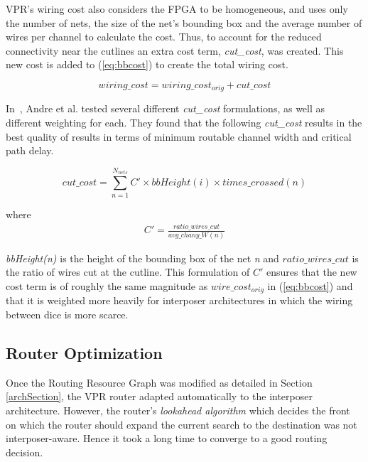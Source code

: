 \documentclass{sig-alternate-2013}
\begin{document}
VPR's wiring cost also considers the FPGA to be homogeneous, and uses only the number of nets, the size of the net's bounding box and the average number of wires per channel to calculate the cost. Thus, to account for the reduced connectivity near the cutlines an extra cost term, \textit{cut\_cost}, was created. This new cost is added to (\ref{eq:bbcost}) to create the total wiring cost.

\begin{equation} \label{eq:total_wiring}
wiring\_cost = wiring\_cost_{orig} + cut\_cost
\end{equation}

In~\cite{hahn2014cad}, Andre et al. tested several different \textit{cut\_cost} formulations, as well as different weighting for each. They found that the following \textit{cut\_cost} results in the best quality of results in terms of minimum routable channel width and critical path delay.

\begin{equation} \label{eq:cost2}
cut\_cost = \sum_{n=1}^{N_{nets}} C' \times bbHeight(i) \times times\_crossed(n)
\end{equation}

where 
\begin{equation} \label{eq:cprime}
\begin{split}
C' = \frac{ratio\_wires\_cut}{avg\_chany\_W(n)}
\end{split}
\end{equation}

\textit{bbHeight(n)} is the height of the bounding box of the net \textit{n} and $ratio\_wires\_cut$ is the ratio of wires cut at the cutline. This formulation of $C'$ ensures that the new cost term is of roughly the same magnitude as $wire\_cost_{orig}$ in (\ref{eq:bbcost}) and that it is weighted more heavily for interposer architectures in which the wiring between dice is more scarce.

\subsection{Router Optimization}
Once the Routing Resource Graph was modified as detailed in Section \ref{archSection}, the VPR router adapted automatically to the interposer architecture. However, the router's \textit{lookahead algorithm} which decides the front on which the router should expand the current search to the destination was not interposer-aware. Hence it took a long time to converge to a good routing decision. 
\end{document}
